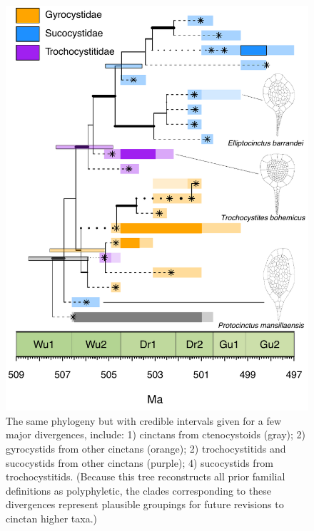 \documentclass{article}
\begin{document}
\begin{figure}
  \includegraphics[width=\textwidth]{figures/Pretty Cinctan Divergence Uncertainty_DFW_edits.pdf} 
  
  \caption{The same phylogeny but with credible intervals given for a few major divergences, include: 1) cinctans from ctenocystoids (gray); 2)  gyrocystids from other cinctans (orange);  2)  trochocystitids and sucocystids from other cinctans (purple);  4) sucocystids from trochocystitids.  (Because this tree reconstructs all prior familial definitions as polyphyletic, the clades corresponding to these divergences represent plausible groupings for future revisions to cinctan higher taxa.)}
\end{figure}
\end{document}
